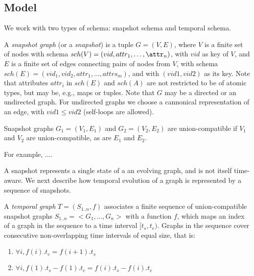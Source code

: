 \begin{itemize}
\section{Model}


We work with two types of schema: snapshot schema and temporal schema.

\begin{definition}
\label{def:sg}
A {\em snapshot graph} (or a {\em snapshot}) is a tuple $G = (V,E)$,
where $V$ is a finite set of nodes with schema $sch(V)=(vid, attr_1,
\ldots, \attr_n)$, with $vid$ as key of $V$, and $E$ is a finite set
of edges connecting pairs of nodes from $V$, with schema
$sch(E)=(vid_1, vid_2, attr_1, \ldots, attrs_m)$, and with
$(vid1,vid2)$ as its key. Note that attributes $attr_i$ in $sch(E)$
and $sch(A)$ are not restricted to be of atomic types, but may be,
e.g., maps or tuples.  Note that $G$ may be a directed or an
undirected graph.  For undirected graphs we choose a cannonical
representation of an edge, with $vid1 \leq vid2$ (self-loops are
allowed).
\end{definition}

Snapshot graphs $G_1 = (V_1, E_1)$ and $G_2 = (V_2, E_2)$ are
union-compatible if $V_1$ and $V_2$ are union-compatible, as are $E_1$
and $E_2$.

For example, ....

A snapshot represents a single state of a an evolving graph, and is
not itself time-aware.  We next describe how temporal evolution of a
graph is represented by a sequence of snapshots.

\begin{definition}
\label{def:tg}
A {\em temporal graph} $T = (S_{1..n}, f)$ associates a finite
sequence of union-compatible snapshot graphs $S_{1..n} = <G_1, \ldots,
G_n>$ with a function $f$, which maps an index of a graph in the
sequence to a time interval $[t_s, t_e)$.  Graphs in the sequence
  cover consecutive non-overlapping time intervals of equal size, that
  is:

\begin{enumerate}
\item $\forall i, f(i).t_e = f(i+1).t_s$
\item $\forall i, f(1).t_s - f(1).t_e = f(i).t_s - f(i).t_e$  
\end{enumerate}
\end{definition}


\end{itemize}
